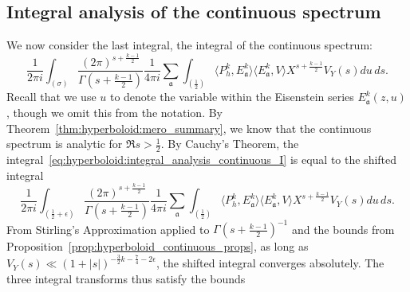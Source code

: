 \subsection{Integral analysis of the continuous spectrum}


We now consider the last integral, the integral of the continuous spectrum:
\begin{equation}\label{eq:hyperboloid:integral_analysis_continuous_I}
  \frac{1}{2\pi i} \int_{(\sigma)} \frac{(2\pi)^{s + \frac{k-1}{2}}}{\Gamma(s +
  \frac{k-1}{2})} \frac{1}{4\pi i} \sum_{\mathfrak{a}} \int_{(\frac{1}{2})} \langle P_h^k,
  E_\mathfrak{a}^k\rangle \langle E_\mathfrak{a}^k, V\rangle X^{s+\frac{k-1}{2}} V_Y(s)
  du \, ds.
\end{equation}
Recall that we use $u$ to denote the variable within the Eisenstein series
$E_\mathfrak{a}^k(z,u)$, though we omit this from the notation.
By Theorem~\ref{thm:hyperboloid:mero_summary}, we know that the continuous spectrum is
analytic for $\Re s > \frac{1}{2}$.
By Cauchy's Theorem, the integral~\eqref{eq:hyperboloid:integral_analysis_continuous_I}
is equal to the shifted integral
\begin{equation}
  \frac{1}{2\pi i} \int_{(\frac{1}{2} + \epsilon)} \frac{(2\pi)^{s +
  \frac{k-1}{2}}}{\Gamma(s + \frac{k-1}{2})} \frac{1}{4\pi i} \sum_{\mathfrak{a}}
  \int_{(\frac{1}{2})} \langle P_h^k, E_\mathfrak{a}^k\rangle \langle E_\mathfrak{a}^k,
  V\rangle X^{s+\frac{k-1}{2}} V_Y(s) du \, ds.
\end{equation}
From Stirling's Approximation applied to $\Gamma(s + \frac{k-1}{2})^{-1}$ and the bounds
from Proposition~\ref{prop:hyperboloid_continuous_props}, as long as $V_Y(s) \ll (1 +
\lvert s \rvert)^{-\frac{3}{2}k - \frac{7}{4} - 2\epsilon}$, the shifted integral
converges absolutely.
The three integral transforms thus satisfy the bounds
